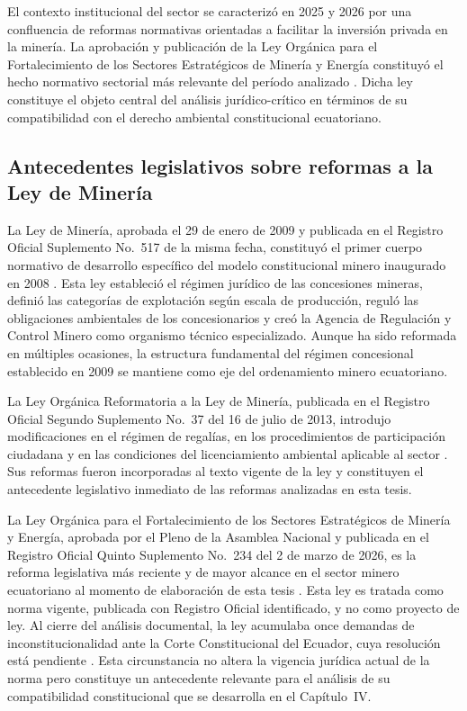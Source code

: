 El contexto institucional del sector se caracterizó en 2025 y 2026 por una confluencia de reformas normativas orientadas a facilitar la inversión privada en la minería. La aprobación y publicación de la Ley Orgánica para el Fortalecimiento de los Sectores Estratégicos de Minería y Energía constituyó el hecho normativo sectorial más relevante del período analizado \parencite{ley_fortalecimiento_2026}. Dicha ley constituye el objeto central del análisis jurídico-crítico en términos de su compatibilidad con el derecho ambiental constitucional ecuatoriano.

\subsection{Antecedentes legislativos sobre reformas a la Ley de Minería}

La Ley de Minería, aprobada el 29 de enero de 2009 y publicada en el Registro Oficial Suplemento No.\ 517 de la misma fecha, constituyó el primer cuerpo normativo de desarrollo específico del modelo constitucional minero inaugurado en 2008 \parencite{ley_mineria_2009}. Esta ley estableció el régimen jurídico de las concesiones mineras, definió las categorías de explotación según escala de producción, reguló las obligaciones ambientales de los concesionarios y creó la Agencia de Regulación y Control Minero como organismo técnico especializado. Aunque ha sido reformada en múltiples ocasiones, la estructura fundamental del régimen concesional establecido en 2009 se mantiene como eje del ordenamiento minero ecuatoriano.

La Ley Orgánica Reformatoria a la Ley de Minería, publicada en el Registro Oficial Segundo Suplemento No.\ 37 del 16 de julio de 2013, introdujo modificaciones en el régimen de regalías, en los procedimientos de participación ciudadana y en las condiciones del licenciamiento ambiental aplicable al sector \parencite{ley_reformatoria_mineria_2013}. Sus reformas fueron incorporadas al texto vigente de la ley y constituyen el antecedente legislativo inmediato de las reformas analizadas en esta tesis.

La Ley Orgánica para el Fortalecimiento de los Sectores Estratégicos de Minería y Energía, aprobada por el Pleno de la Asamblea Nacional y publicada en el Registro Oficial Quinto Suplemento No.\ 234 del 2 de marzo de 2026, es la reforma legislativa más reciente y de mayor alcance en el sector minero ecuatoriano al momento de elaboración de esta tesis \parencite{ley_fortalecimiento_2026}. Esta ley es tratada como norma vigente, publicada con Registro Oficial identificado, y no como proyecto de ley. Al cierre del análisis documental, la ley acumulaba once demandas de inconstitucionalidad ante la Corte Constitucional del Ecuador, cuya resolución está pendiente \parencite{primicias_demandas_2026}. Esta circunstancia no altera la vigencia jurídica actual de la norma pero constituye un antecedente relevante para el análisis de su compatibilidad constitucional que se desarrolla en el Capítulo~IV.

